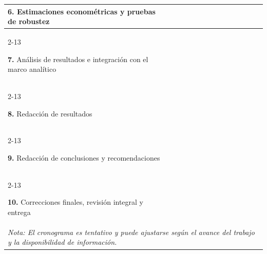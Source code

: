 \documentclass[../../PTFM.tex]{subfiles}
\begin{document}
\begin{longtable}{|p{6.2cm}|*{12}{c|}}
		\textbf{6.} Estimaciones econométricas y pruebas de robustez
		&  &  &  & \cellcolor{gray!40} & \cellcolor{gray!40} & \cellcolor{gray!40} &  &  &  &  &  &  \\
		\cline{2-13}
		
		\textbf{7.} Análisis de resultados e integración con el marco analítico
		&  &  &  &  &  & \cellcolor{gray!40} & \cellcolor{gray!40} &  &  &  &  &  \\
		\cline{2-13}
		
		\textbf{8.} Redacción de resultados
		&  &  &  &  &  & \cellcolor{gray!40} & \cellcolor{gray!40} & \cellcolor{gray!40} &  &  &  &  \\
		\cline{2-13}
		
		\textbf{9.} Redacción de conclusiones y recomendaciones
		&  &  &  &  &  &  &  & \cellcolor{gray!40} & \cellcolor{gray!40} &  &  &  \\
		\cline{2-13}
		
		\textbf{10.} Correcciones finales, revisión integral y entrega
		&  &  &  &  &  &  &  &  & \cellcolor{gray!40} & \cellcolor{gray!40} & \cellcolor{gray!40} &  \\
		
		\hline
		\multicolumn{13}{p{\textwidth}}{%
			\textit{Nota: El cronograma es tentativo y puede ajustarse según el avance del trabajo y la disponibilidad de información.}
		} 
		
	\end{longtable}
	
\end{document}
